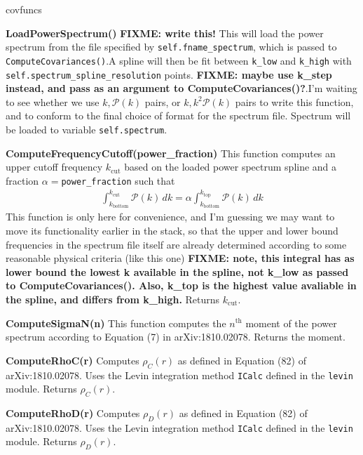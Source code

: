\documentclass[10pt,a4paper]{article}
\begin{document}
\begin{labeling}{covfuncs}
	\item[\textbf{LoadPowerSpectrum()}] \textbf{FIXME: write this!} This will load
	the power spectrum from the file specified by \verb|self.fname_spectrum|, which is passed to \verb|ComputeCovariances()|.A spline will then be fit between \verb|k_low| and \verb|k_high| with \verb|self.spectrum_spline_resolution| points. \textbf{FIXME: maybe use k\_step instead, and pass as an argument to ComputeCovariances()?}.I'm waiting to see whether we use $k,\mathcal{P}(k)$ pairs, or $k,k^2\mathcal{P}(k)$ pairs to write this function, and to conform to the final choice of format for the spectrum file. Spectrum will be loaded to variable \verb|self.spectrum|.
	
	\item[\textbf{ComputeFrequencyCutoff(power\_fraction)}] This function computes an upper cutoff frequency $k_\mathrm{cut}$ based on the loaded power spectrum spline and a fraction $\alpha=$\verb|power_fraction| such that
	\begin{align}
		\int_{k_\mathrm{bottom}}^{k_\mathrm{cut}} \mathcal{P}(k)\, dk = \alpha 	\int_{k_\mathrm{bottom}}^{k_\mathrm{top}} \mathcal{P}(k)\, dk
	\end{align}
	This function is only here for convenience, and I'm guessing we may want to move its functionality earlier in the stack, so that the upper and lower bound frequencies in the spectrum file itself are already determined according to some reasonable physical criteria (like this one)
	\textbf{FIXME: note, this integral has as lower bound the lowest k available in the spline, not k\_low as passed to ComputeCovariances(). Also, k\_top is the highest value avaliable in the spline, and differs from k\_high.} Returns $k_\text{cut}$.
	
	\item[\textbf{ComputeSigmaN(n)}] This function computes the $n^\text{th}$ moment of the power spectrum according to Equation (7) in arXiv:1810.02078. Returns the moment.
	
	\item[\textbf{ComputeRhoC(r)}] Computes $\rho_C(r)$ as defined in Equation (82) of arXiv:1810.02078. Uses the Levin integration method \verb|ICalc| defined in the \verb|levin| module. Returns $\rho_C(r)$.
	
	\item[\textbf{ComputeRhoD(r)}] Computes $\rho_D(r)$ as defined in Equation (82) of arXiv:1810.02078. Uses the Levin integration method \verb|ICalc| defined in the \verb|levin| module. Returns $\rho_D(r)$.
	

\end{labeling}
\end{document}
